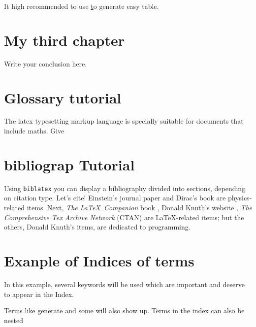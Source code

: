 It high recommended to use \href{https://www.tablesgenerator.com/#} to generate easy table.




\chapter{My third chapter}

Write your conclusion here.






\chapter{Glossary tutorial}

 The \Gls{latex} typesetting markup language is specially suitable 
for documents that include \gls{maths}. Give



\chapter{bibliograp Tutorial}

Using \texttt{biblatex} you can display a bibliography divided into sections, depending on citation type. 
Let's cite! Einstein's journal paper \cite{einstein} and Dirac's book \cite{dirac} are physics-related items. 
Next, \textit{The \LaTeX\ Companion} book \cite{latexcompanion}, Donald Knuth's website \cite{knuthwebsite}, \textit{The Comprehensive Tex Archive Network} (CTAN) \cite{ctan} are \LaTeX-related items; but the others, Donald Knuth's items, \cite{knuth-fa,knuth-acp} are dedicated to programming.



\chapter{Exanple of Indices of terms}

In this example, several keywords will be 
used which are important and deserve to appear in the 
Index.

Terms like generate and some 
will also show up. Terms in the index can also be 
nested 